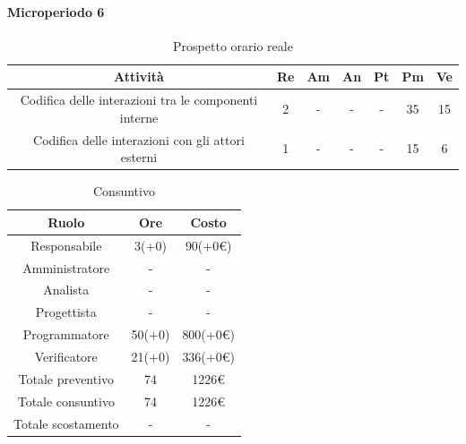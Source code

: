 \paragraph{Microperiodo 6}
\begin{table}[H]
	\centering
	\begin{tabular}{|c|c|c|c|c|c|c|}
		\hline
		\rowcolor{lighter-grayer}
		\textbf{Attività} & \textbf{Re}        & \textbf{Am}        & \textbf{An}        & \textbf{Pt}        & \textbf{Pm}        & \textbf{Ve}        \\ \hline
		
		Codifica delle interazioni tra le componenti interne & 2           & -           & -           & -           & 35          & 15          \\ \hline
		Codifica delle interazioni con gli attori esterni    & 1           & -           & -           & -           & 15          & 6           \\ \hline
		
	\end{tabular}
	\caption{ Prospetto orario reale\\}
\end{table}

\begin{table}[H]
	\centering
	\renewcommand{\arraystretch}{1.5}
	\begin{tabular}{|c|c|c|}
		\hline
		\rowcolor{lighter-grayer}
		Ruolo & Ore & Costo \\ \hline
		Responsabile & 3(+0) & 90(+0\euro) \\ \hline
		Amministratore & - & - \\ \hline
		Analista & - & - \\ \hline
		Progettista & - & - \\ \hline
		Programmatore & 50(+0) & 800(+0\euro) \\ \hline
		Verificatore & 21(+0) & 336(+0\euro) \\ \hline
		Totale preventivo & 74 & 1226\euro \\ \hline
		Totale consuntivo & 74 & 1226\euro \\ \hline
		Totale scostamento & - & - \\ \hline
	\end{tabular}
	\caption{ Consuntivo\\}
\end{table}

